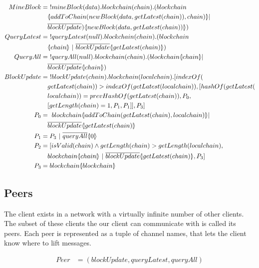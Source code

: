 \begin{align*}
    MineBlock &=\ !mineBlock(data).blockchain(chain).(blockchain\\
        &\quad \lift{}{addToChain(newBlock(data,getLatest(chain)),chain)}|\\
        &\quad \overline{blockUpdate})\lift{}{newBlock(data, getLatest(chain))})\\
    QueryLatest &=\ !queryLatest(null).blockchain(chain).(blockchain\\
        &\quad \lift{}{chain}\ |\ \overline{blockUpdate}\lift{}{getLatest(chain)})\\
        QueryAll &=\ !queryAll(null).blockchain(chain).(blockchain\lift{}{chain}|\\
        &\quad \overline{blockUpdate}\lift{}{chain})\\
    BlockUpdate &=\ !blockUpdate(chain).blockchain(localchain).[indexOf(\\
        &\quad getLatest(chain))>indexOf(getLatest(localchain)),[hashOf(getLatest(\\
        &\quad localchain))=prevHashOf(getLatest(chain)),P_0,\\
        &\quad [getLength(chain)=1,P_1,P_1]],P_3]\\
    P_0 &=\ blockchain\lift{}{addToChain(getLatest(chain),localchain)}|\\
        &\quad \overline{blockUpdate}\lift{}{getLatest(chain)}\\
    P_1 &= P_3\ |\ \overline{queryAll}\lift{}{0}\\
    P_2 &= [isValid(chain) \land getLength(chain) > getLength(localchain),\\
        &\quad blockchain\lift{}{chain}\ |\ \overline{blockUpdate}\lift{}{getLatest(chain)},P_3]\\
    P_3 &= blockchain\lift{}{blockchain}
\end{align*}

\subsection{Peers}
The client exists in a network with a virtually infinite number of other clients.
The subset of these clients the our client can communicate with is called its peers.
Each peer is represented as a tuple of channel names, that lets the client know where to lift messages.

\begin{align*}
	Peer &= (blockUpdate, queryLatest, queryAll)
\end{align*}

